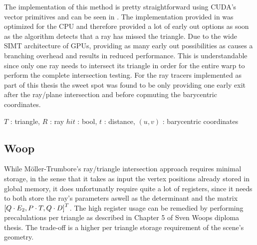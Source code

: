The implementation of this method is pretty straightforward using CUDA's vector
primitives and can be seen in . The implementation
provided in  was optimized for the CPU and therefore
provided a lot of early out options as soon as the algorithm detects that a ray
has missed the triangle. Due to the wide SIMT architecture of GPUs, providing as
many early out possibilities as  causes a branching
overhead and results in reduced performance. This is understandable since only
one ray needs to intersect its triangle in order for the entire warp to perform
the complete intersection testing. For the ray tracers implemented as part of
this thesis the sweet spot was found to be only providing one early exit after
the ray/plane intersection and before copmuting the barycentric coordinates.

\begin{algorithm}
  \caption{Möller-Trumbore ray/triangle intersection test}
  \label{alg:moellerTrumbore}
  \begin{algorithmic}
              {$T$ : triangle, $R$ : ray}
              {$hit$ : bool, $t$ : distance, $(u,v)$ : barycentric coordinates}
              {
                \ELSE
                \ENDIF
              }
  \end{algorithmic}
\end{algorithm}


\subsection{Woop}


While Möller-Trumbore's ray/triangle intersection approach requires minimal
storage, in the sense that it takes as input the vertex positions already stored
in global memory, it does unfortunatly require quite a lot of registers, since
it needs to both store the ray's parameters aswell as the determinant and the
matrix $\left[Q \cdot E_2, P \cdot T, Q \cdot D \right]^T$. The high register usage
can be remedied by performing precalulations per triangle as described in
Chapter 5 of Sven Woops diploma thesis. The trade-off
is a higher per triangle storage requirement of the scene's geometry.

